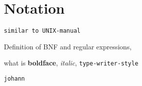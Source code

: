 \chapter{Notation}\label{chap:2}

{\tt similar to UNIX-manual}

Definition of BNF and regular expressions,

what is {\bf boldface}, {\em italic}, {\tt type-writer-style}


{\tt johann}
